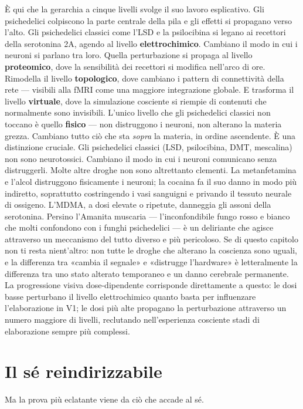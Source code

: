 \documentclass[11pt, twoside, openright]{book}
\begin{document}
È qui che la gerarchia a cinque livelli svolge il suo lavoro esplicativo. Gli psichedelici colpiscono la parte centrale della pila e gli effetti si propagano verso l'alto. Gli psichedelici classici come l'LSD e la psilocibina si legano ai recettori della serotonina 2A, agendo al livello \textbf{elettrochimico}. Cambiano il modo in cui i neuroni si parlano tra loro. Quella perturbazione si propaga al livello \textbf{proteomico}, dove la sensibilità dei recettori si modifica nell'arco di ore. Rimodella il livello \textbf{topologico}, dove cambiano i pattern di connettività della rete --- visibili alla fMRI come una maggiore integrazione globale. E trasforma il livello \textbf{virtuale}, dove la simulazione cosciente si riempie di contenuti che normalmente sono invisibili. L'unico livello che gli psichedelici classici non toccano è quello \textbf{fisico} --- non distruggono i neuroni, non alterano la materia grezza. Cambiano tutto ciò che sta \textit{sopra} la materia, in ordine ascendente. È una distinzione cruciale. Gli psichedelici classici (LSD, psilocibina, DMT, mescalina) non sono neurotossici. Cambiano il modo in cui i neuroni comunicano senza distruggerli. Molte altre droghe non sono altrettanto clementi. La metanfetamina e l'alcol distruggono fisicamente i neuroni; la cocaina fa il suo danno in modo più indiretto, soprattutto costringendo i vasi sanguigni e privando il tessuto neurale di ossigeno. L'MDMA, a dosi elevate o ripetute, danneggia gli assoni della serotonina. Persino l'Amanita muscaria --- l'inconfondibile fungo rosso e bianco che molti confondono con i funghi psichedelici --- è un deliriante che agisce attraverso un meccanismo del tutto diverso e più pericoloso. Se di questo capitolo non ti resta nient'altro: non tutte le droghe che alterano la coscienza sono uguali, e la differenza tra «cambia il segnale» e «distrugge l'hardware» è letteralmente la differenza tra uno stato alterato temporaneo e un danno cerebrale permanente. La progressione visiva dose-dipendente corrisponde direttamente a questo: le dosi basse perturbano il livello elettrochimico quanto basta per influenzare l'elaborazione in V1; le dosi più alte propagano la perturbazione attraverso un numero maggiore di livelli, reclutando nell'esperienza cosciente stadi di elaborazione sempre più complessi.

\section*{Il sé reindirizzabile}

Ma la prova più eclatante viene da ciò che accade al sé.
\end{document}
